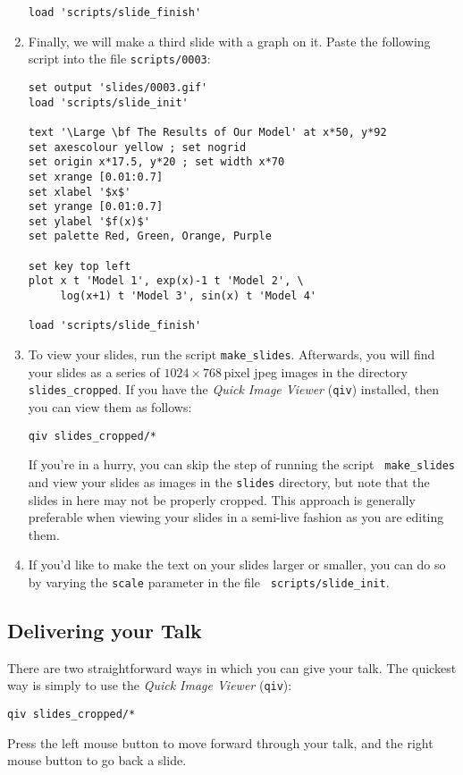 \begin{enumerate}
\begin{verbatim}
load 'scripts/slide_finish'
\end{verbatim}
\item Finally, we will make a third slide with a graph on it. Paste the
following script into the file {\tt scripts/0003}:
\begin{verbatim}
set output 'slides/0003.gif'
load 'scripts/slide_init'

text '\Large \bf The Results of Our Model' at x*50, y*92
set axescolour yellow ; set nogrid
set origin x*17.5, y*20 ; set width x*70
set xrange [0.01:0.7]
set xlabel '$x$'
set yrange [0.01:0.7]
set ylabel '$f(x)$'
set palette Red, Green, Orange, Purple

set key top left
plot x t 'Model 1', exp(x)-1 t 'Model 2', \
     log(x+1) t 'Model 3', sin(x) t 'Model 4'

load 'scripts/slide_finish'
\end{verbatim}
\item To view your slides, run the script {\tt make\_slides}. Afterwards, you
will find your slides as a series of $1024\times768$\,pixel jpeg images in the
directory {\tt slides\_cropped}.  If you have the {\it Quick Image
Viewer}\index{Quick Image Viewer} ({\tt qiv}) installed, then you can view them
as follows:
\begin{verbatim}
qiv slides_cropped/*
\end{verbatim}
If you're in a hurry, you can skip the step of running the script {\tt
make\_slides} and view your slides as images in the {\tt slides} directory, but
note that the slides in here may not be properly cropped. This approach is
generally preferable when viewing your slides in a semi-live fashion as you are
editing them.
\item If you'd like to make the text on your slides larger or smaller, you can
do so by varying the {\tt scale} parameter in the file {\tt
scripts/slide\_init}.
\end{enumerate}


\subsection{Delivering your Talk}

There are two straightforward ways in which you can give your talk. The
quickest way is simply to use the {\it Quick Image Viewer}\index{Quick Image
Viewer} ({\tt qiv}):
\begin{verbatim}
qiv slides_cropped/*
\end{verbatim}
Press the left mouse button to move forward through your talk, and the right
mouse button to go back a slide.

